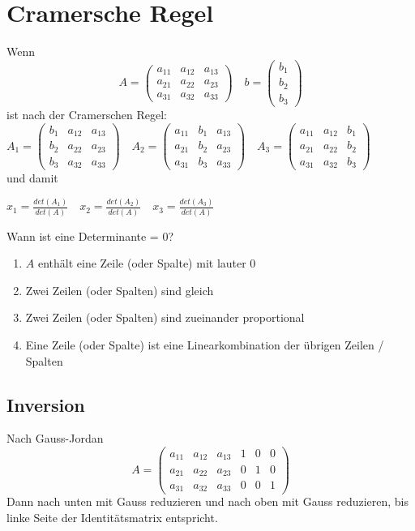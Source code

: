 \documentclass{report}
\begin{document}
\section{Cramersche Regel}
Wenn
\begin{equation}A=\left(\begin{matrix}a_{11} & a_{12} & a_{13}\\a_{21} & a_{22} & a_{23}\\a_{31} & a_{32} & a_{33}\end{matrix}\right) \quad b = \left(\begin{matrix}b_1\\b_2\\b_3\end{matrix}\right)\end{equation}
ist nach der Cramerschen Regel:\\
$A_1=\left(\begin{matrix}b_1 & a_{12} & a_{13}\\b_2 & a_{22} & a_{23}\\b_3 & a_{32} & a_{33}\end{matrix}\right) \quad A_2=\left(\begin{matrix}a_{11} & b_1 & a_{13}\\a_{21} & b_2 & a_{23}\\a_{31} & b_3 & a_{33}\end{matrix}\right) \quad A_3=\left(\begin{matrix}a_{11} & a_{12} & b_1\\a_{21} & a_{22} & b_2\\a_{31} & a_{32} & b_3\end{matrix}\right)$\\
und damit
\begin{center}
$x_1 = \frac{det(A_1)}{det(A)} \quad x_2 = \frac{det(A_2)}{det(A)} \quad x_3 = \frac{det(A_3)}{det(A)}$
\end{center}
Wann ist eine Determinante = 0?
\begin{enumerate}
\item $A$ enthält eine Zeile (oder Spalte) mit lauter 0
\item Zwei Zeilen (oder Spalten) sind gleich
\item Zwei Zeilen (oder Spalten) sind zueinander proportional
\item Eine Zeile (oder Spalte) ist eine Linearkombination der übrigen Zeilen / Spalten\end{enumerate}
\subsection{Inversion}
Nach Gauss-Jordan
\begin{equation}A=\left(\begin{matrix}a_{11} & a_{12} & a_{13} & 1 & 0 & 0\\a_{21} & a_{22} & a_{23} & 0 & 1 & 0\\a_{31} & a_{32} & a_{33} & 0 & 0 & 1\end{matrix}\right)\end{equation}
Dann nach unten mit Gauss reduzieren und nach oben mit Gauss reduzieren, bis linke Seite der Identitätsmatrix entspricht.
\end{document}

